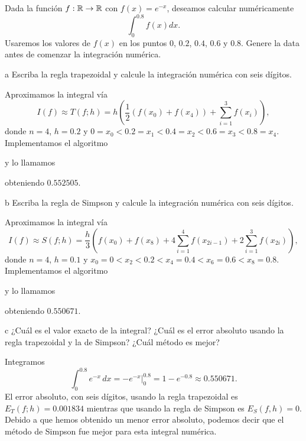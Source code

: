 \begin{statement}{2}
  Dada la funci\'on $f: \mathbb{R} \to \mathbb{R}$ con $f(x) = e^{-x}$, deseamos calcular num\'ericamente
  \[
    \int_0^{0.8} f(x) dx.
  \]
  Usaremos los valores de $f(x)$ en los puntos $0$, $0.2$, $0.4$, $0.6$ y $0.8$.
  Genere la data antes de comenzar la integraci\'on num\'erica.
\end{statement}

\begin{statement}{a}
  Escriba la regla trapezoidal y calcule la integraci\'on num\'erica con seis d\'igitos.
\end{statement}

\begin{solution}
  Aproximamos la integral v\'ia
  \[
    I(f) \approx T(f; h) =
    h \left(\frac{1}{2}(f(x_0) + f(x_4)) + \sum_{i = 1}^3 f(x_i)\right),
  \]
  donde $n = 4$, $h = 0.2$ y $0 = x_0 < 0.2 = x_1 < 0.4 = x_2 < 0.6 = x_3 < 0.8 = x_4$.
  Implementamos el algoritmo
  
  y lo llamamos
  
  obteniendo $0.552505$.
\end{solution}

\begin{statement}{b}
  Escriba la regla de Simpson y calcule la integraci\'on num\'erica con seis d\'igitos.
\end{statement}

\begin{solution}
  Aproximamos la integral v\'ia
  \[
    I(f) \approx S(f; h) = \frac{h}{3} \left(f(x_0) + f(x_8) + 4 \sum_{i = 1}^4 f(x_{2i - 1}) + 2 \sum_{i = 1}^3 f(x_{2i})\right),
  \]
  donde $n = 4$, $h = 0.1$ y $x_0 = 0 < x_2 < 0.2 < x_4 = 0.4 < x_6 = 0.6 < x_8 = 0.8$.
  Implementamos el algoritmo
  
  y lo llamamos
  
  obteniendo $0.550671$.
\end{solution}

\begin{statement}{c}
  ¿Cu\'al es el valor exacto de la integral?
  ¿Cu\'al es el error absoluto usando la regla trapezoidal y la de Simpson?
  ¿Cu\'al m\'etodo es mejor?
\end{statement}

\begin{solution}
  Integramos
  \[
      \int_0^{0.8} e^{-x} \, dx = -e^{-x} \Big|_0^{0.8} = 1 - e^{-0.8} \approx 0.550671.
  \]
  El error absoluto, con seis d\'igitos,
  usando la regla trapezoidal es $E_T(f; h) = 0.001834$
  mientras que usando la regla de Simpson es $E_S(f, h) = 0$.
  Debido a que hemos obtenido un menor error absoluto,
  podemos decir que el m\'etodo de Simpson
  fue mejor para esta integral num\'erica.
\end{solution}

